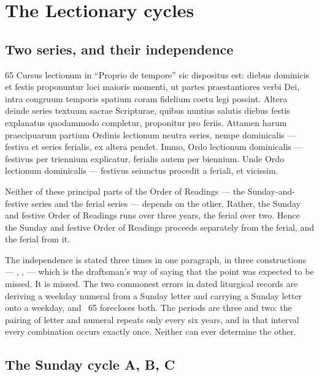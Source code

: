 \section{The Lectionary cycles}
\label{sec:cycles}

\subsection{Two series, and their independence}

\begin{normtext}{  65}
Cursus lectionum in ``Proprio de tempore'' sic dispositus est: diebus dominicis et festis proponuntur
loci maioris momenti, ut partes praestantiores verbi Dei, intra congruum temporis spatium coram
fidelium coetu legi possint. Altera deinde series textuum sacrae Scripturae, quibus nuntius salutis
diebus festis explanatus quodammodo completur, proponitur pro feriis. Attamen harum praecipuarum
partium Ordinis lectionum neutra series, nempe dominicalis --- festiva et series ferialis, ex altera
pendet. Immo, Ordo lectionum dominicalis --- festivus per triennium explicatur, ferialis autem per
biennium. Unde Ordo lectionum dominicalis --- festivus seiunctus procedit a feriali, et vicissim.
\end{normtext}

\begin{workingrendering}
Neither of these principal parts of the Order of Readings --- the Sunday-and-festive series and the
ferial series --- depends on the other. Rather, the Sunday and festive Order of Readings runs over
three years, the ferial over two. Hence the Sunday and festive Order of Readings proceeds separately
from the ferial, and the ferial from it.
\end{workingrendering}

The independence is stated three times in one paragraph, in three constructions ---
, ,  --- which is the
draftsman's way of saying that the point was expected to be missed. It is missed. The two commonest
errors in dated liturgical records are deriving a weekday numeral from a Sunday letter and carrying
a Sunday letter onto a weekday, and ~65 forecloses both. The periods are three and two: the
pairing of letter and numeral repeats only every six years, and in that interval every combination
occurs exactly once. Neither can ever determine the other.

\subsection{The Sunday cycle A, B, C}

